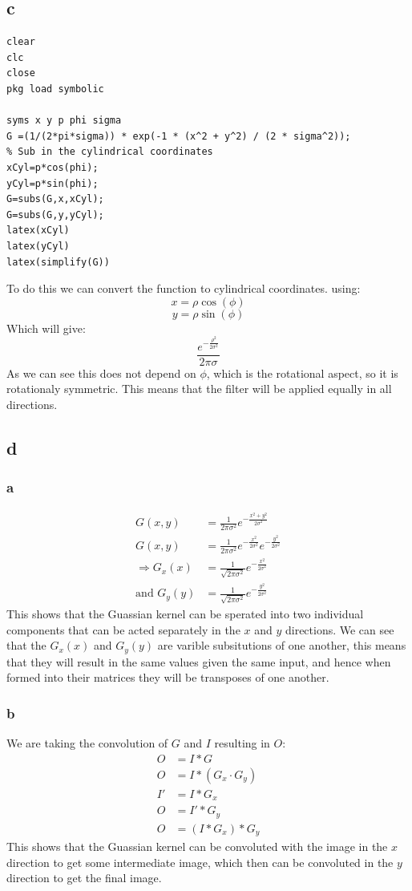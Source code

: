 \documentclass[11pt]{article}
\begin{document}
\subsection{c}
\label{sec:org22afb3f}
\begin{verbatim}
clear
clc
close
pkg load symbolic

syms x y p phi sigma
G =(1/(2*pi*sigma)) * exp(-1 * (x^2 + y^2) / (2 * sigma^2));
% Sub in the cylindrical coordinates
xCyl=p*cos(phi);
yCyl=p*sin(phi);
G=subs(G,x,xCyl);
G=subs(G,y,yCyl);
latex(xCyl)
latex(yCyl)
latex(simplify(G))
\end{verbatim}
To do this we can convert the function to cylindrical coordinates. using:
\[x= \rho \cos{\left(\phi \right)}\]
\[y= \rho \sin{\left(\phi \right)}\]
Which will give:
\[\frac{e^{- \frac{\rho^{2}}{2 \sigma^{2}}}}{2 \pi \sigma}\]
As we can see this does not depend on \(\phi\), which is the rotational aspect, so it is rotationaly symmetric. This means that the filter will be applied equally in all directions.
\subsection{d}
\label{sec:org3fdd75f}
\subsubsection{a}
\label{sec:orgf48f845}
\begin{align*}
G(x,y)&=\frac{1}{2\pi \sigma^{2}}e^{-\frac{x^2+y^2}{2 \sigma^2}} \\
G(x,y)&=\frac{1}{2\pi \sigma^{2}}e^{-\frac{x^2}{2 \sigma^2}}e^{-\frac{y^2}{2 \sigma^2}} \\
\Rightarrow G_x(x)&=\frac{1}{\sqrt{2\pi \sigma^{2}}}e^{-\frac{x^2}{2 \sigma^2}} \\
\textrm{and } G_y(y)&=\frac{1}{\sqrt{2\pi \sigma^{2}}}e^{-\frac{y^2}{2 \sigma^2}}
\end{align*}
This shows that the Guassian kernel can be sperated into two individual components that can be acted separately in the \(x\) and \(y\) directions. We can see that the \(G_x(x)\) and \(G_y(y)\) are varible subsitutions of one another, this means that they will result in the same values given the same input, and hence when formed into their matrices they will be transposes of one another.
\subsubsection{b}
\label{sec:org22ee6ec}
We are taking the convolution of \(G\) and \(I\) resulting in \(O\):
\begin{align*}
O&=I*G                     \\
O&=I*(G_x\cdot G_y)        \\
I'&=I*G_x                  \\
O&=I'* G_y                 \\
O&=(I*G_x)*G_y
\end{align*}
This shows that the Guassian kernel can be convoluted with the image in the \(x\) direction to get some intermediate image, which then can be convoluted in the \(y\) direction to get the final image.
\end{document}
